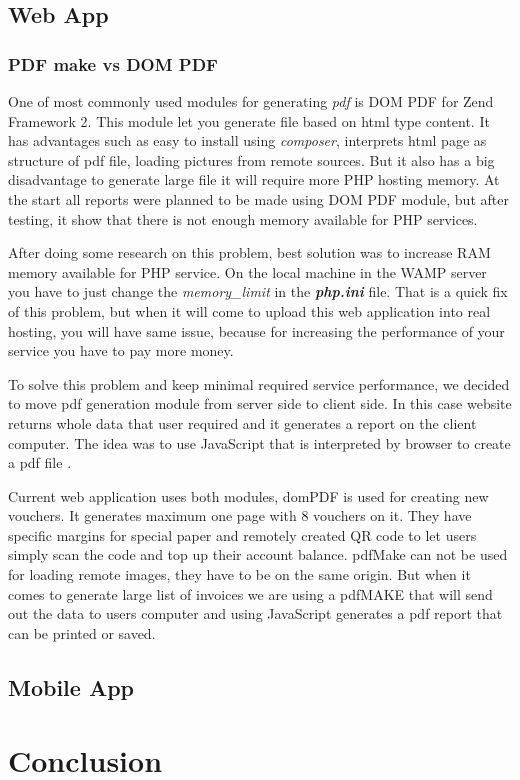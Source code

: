 \section{Web App}
	\subsection{PDF make vs DOM PDF}
		One of most commonly used modules for generating \textit{pdf} is DOM PDF for Zend Framework 2. This module let you generate file based on html type content. It has advantages such as easy to install using \textit{composer}, interprets html page as structure of pdf file, loading pictures from remote sources. But it also has a big disadvantage to generate large file it will require more PHP hosting memory. 
		At the start all reports were planned to be made using DOM PDF module, but after testing, it show that there is not enough memory available for PHP services. 
		
		After doing some research on this problem, best solution was to increase RAM memory available for PHP service. On the local machine in the WAMP server you have to just change the \textit{memory\_limit} in the \textit{\textbf{php.ini}} file. That is a quick fix of this problem, but when it will come to upload this web application into real hosting, you will have same issue, because for increasing the  performance of your service you have to pay more money.
		
		To solve this problem and keep minimal required service performance, we decided to move pdf generation module from server side to client side. In this case website returns whole data that user required and it generates a report on the client computer. The idea was to use JavaScript that is interpreted by browser to create a pdf file \cite{PDF_Make_module}.
		
		Current web application uses both modules, domPDF is used for creating new vouchers. It generates maximum one page with 8 vouchers on it. They have specific margins for special paper and remotely created QR code to let users simply scan the code and top up their account balance. pdfMake can not be used for loading remote images, they have to be on the same origin. But when it comes to generate large list of invoices we are using a pdfMAKE that will send out the data to users computer and using JavaScript generates a pdf report that can be printed or saved.
	
\section{Mobile App}


\chapter{Conclusion}	%

